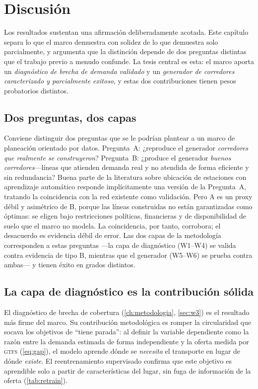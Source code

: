 \chapter{Discusión}
\label{ch:discusion}

Los resultados sustentan una afirmación deliberadamente acotada. Este capítulo separa
lo que el marco demuestra con solidez de lo que demuestra solo parcialmente, y
argumenta que la distinción depende de dos preguntas distintas que el trabajo previo a
menudo confunde. La tesis central es esta: el marco aporta un \emph{diagnóstico de
brecha de demanda validado} y un \emph{generador de corredores caracterizado y
parcialmente exitoso}, y estas dos contribuciones tienen pesos probatorios distintos.

\section{Dos preguntas, dos capas}
\label{sec:disc-twoquestions}

Conviene distinguir dos preguntas que se le podrían plantear a un marco de planeación
orientado por datos. Pregunta~A: ¿reproduce el generador \emph{corredores que
realmente se construyeron}? Pregunta~B: ¿produce el generador \emph{buenos
corredores}---líneas que atienden demanda real y no atendida de forma eficiente y sin
redundancia? Buena parte de la literatura sobre ubicación de estaciones con aprendizaje
automático responde implícitamente una versión de la Pregunta~A, tratando la
coincidencia con la red existente como validación. Pero A es un proxy débil y
asimétrico de B, porque las líneas construidas no están garantizadas como óptimas: se
eligen bajo restricciones políticas, financieras y de disponibilidad de suelo que el
marco no modela. La coincidencia, por tanto, corrobora; el desacuerdo es evidencia
débil de error. Las dos capas de la metodología corresponden a estas preguntas ---la
capa de diagnóstico (W1--W4) se valida contra evidencia de tipo B, mientras que el
generador (W5--W6) se prueba contra ambas--- y tienen éxito en grados distintos.

\section{La capa de diagnóstico es la contribución sólida}
\label{sec:disc-diagnostic}

El diagnóstico de brecha de cobertura (\cref{ch:metodologia}, \cref{sec:w3}) es el
resultado más firme del marco. Su contribución metodológica es romper la circularidad
que socava los objetivos de ``tiene parada'': al definir la variable dependiente como
la razón entre la demanda estimada de forma independiente y la oferta medida por
\textsc{gtfs} (\cref{eq:gap}), el modelo aprende dónde se \emph{necesita} el transporte
en lugar de dónde \emph{existe}. El reentrenamiento supervisado confirma que este
objetivo es aprendible solo a partir de características del lugar, sin fuga de
información de la oferta (\cref{tab:retrain}).

